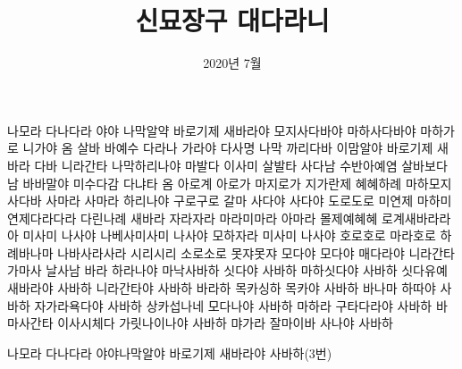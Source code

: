 \documentclass[25pt, a2paper ]{tikzposter}
\title{ 신묘장구 대다라니  }
\author{ 2020년 7월 }
\begin{document}
	\maketitle





			{
				\begin{LARGE}

나모라 다나다라 야야 나막알약 바로기제 새바라야 모지사다바야 마하사다바야 마하가로 니가야 옴 살바 바예수 다라나 가라야 다사명 나막 까리다바 이맘알야 바로기제 새바라 다바 니라간타 나막하리나야 마발다 이사미 살발타 사다남 수반아예염 살바보다남 바바말야 미수다감 다냐타 옴 아로계 아로가 마지로가 지가란제 혜혜하례 마하모지 사다바 사마라 사마라 하리나야 구로구로 갈마 사다야 사다야 도로도로 미연제 마하미연제다라다라 다린나례 새바라 자라자라 마라미마라 아마라 몰제예혜혜 로계새바라라아 미사미 나사야 나베사미사미 나사야 모하자라 미사미 나사야 호로호로 마라호로 하례바나마 나바사라사라 시리시리 소로소로 못쟈못쟈 모다야 모다야 매다라야 니라간타 가마사 날사남 바라 하라나야 마낙사바하 싯다야 사바하 마하싯다야 사바하 싯다유예 새바라야 사바하 니라간타야 사바하 바라하 목카싱하 목카야 사바하 바나마 하따야 사바하 자가라욕다야 사바하 상카섭나네 모다나야 사바하 마하라 구타다라야 사바하 바마사간타 이사시체다 가릿나이나야 사바하 먀가라 잘마이바 사나야 사바하

나모라 다나다라 야야나막알야 바로기제 새바라야 사바하(3번)

				\end{LARGE}
			}
\end{document}
